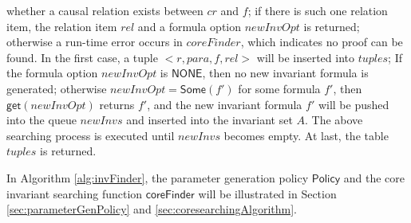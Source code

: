 \documentclass[final]{IEEEtran}
\newcommand\lyj[1]{\textcolor{magenta}{lyj: #1}}
\begin{document}
 whether  a causal relation exists between $cr$ and $f$; if there is such one relation item, the relation item $rel$ and a  formula option $newInvOpt$ is returned; otherwise a run-time error occurs in  $coreFinder$, which indicates no proof can be found. In the first case, a tuple $<r, para, f, rel>$ will be inserted into $tuples$; If the formula option $newInvOpt$ is $\mathsf{NONE}$, then no new invariant formula is generated; otherwise $newInvOpt=\mathsf{Some}(f')$ for some formula $f'$, then  $\mathsf{get}(newInvOpt)$ returns $f'$, and the new invariant formula $f'$ will be pushed into the queue $newInvs$ and inserted into the invariant set $A$.  The above searching process is executed until $newInvs$ becomes empty.  At last, the table $tuples$ is returned.





In Algorithm \ref{alg:invFinder}, the parameter generation policy $\mathsf{Policy}$  and the core invariant searching function $\mathsf{coreFinder}$ will be illustrated in Section \ref{sec:parameterGenPolicy} and \ref{sec:coresearchingAlgorithm}.
\end{document}

